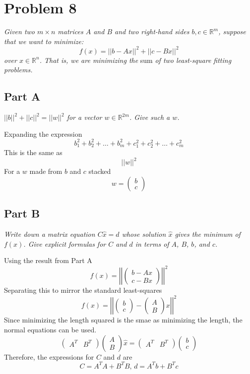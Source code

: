 \documentclass{article}
\begin{document}
\section*{Problem 8}

\textit{Given two $m \times n$ matrices $A$ and $B$ and two right-hand sides
$b, c \in \mathbb{R}^m$, suppose that we want to minimize:}
$$ f(x) = || b - Ax ||^2 + || c - Bx ||^2 $$
\textit{over $x \in \mathbb{R}^n$. That is, we are minimizing the} sum
\textit{of two least-square fitting problems.}

\subsection*{Part A}

\textit{$|| b ||^2 + || c ||^2 = || w ||^2$ for a vector $ w \in
\mathbb{R}^{2m}$. Give such a $w$.}

\bigbreak

Expanding the expression
$$ b_1^2 + b_2^2 + \ldots + b_m^2 + c_1^2 + c_2^2 + \ldots + c_m^2 $$
This is the same as
$$ || w ||^2 $$
For a $w$ made from $b$ and $c$ stacked
$$ w = \begin{pmatrix}
    b \\
    c
\end{pmatrix} $$

\subsection*{Part B}

\textit{Write down a matrix equation $C\hat{x} = d$ whose solution $\hat{x}$
gives the minimum of $f(x)$. Give explicit formulas for $C$ and $d$ in terms
of $A$, $B$, $b$, and $c$.}

\bigbreak

Using the result from Part A
$$ f(x) = \left|\left| \begin{pmatrix}
    b - Ax \\
    c - Bx
\end{pmatrix} \right| \right|^2 $$
Separating this to mirror the standard least-squares
$$ f(x) = \left|\left| \begin{pmatrix}
    b \\
    c
\end{pmatrix} - \begin{pmatrix}
    A \\
    B
\end{pmatrix} x \right|\right|^2 $$
Since minimizing the length squared is the smae as minimizing the length, the
normal equations can be used.
$$ \begin{pmatrix}
    A^T & B^T
\end{pmatrix} \begin{pmatrix}
    A \\
    B
\end{pmatrix} \hat{x} = \begin{pmatrix}
    A^T & B^T
\end{pmatrix} \begin{pmatrix}
    b \\
    c
\end{pmatrix} $$
Therefore, the expressions for $C$ and $d$ are
$$ C = A^T A + B^T B,\, d = A^T b + B^T c $$
\end{document}
